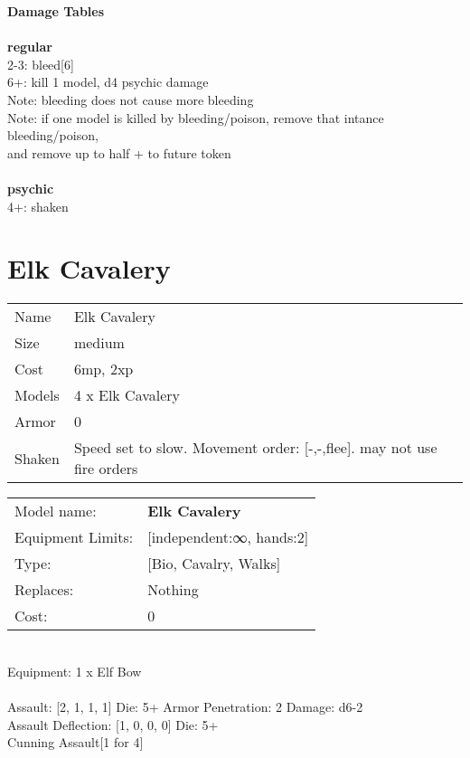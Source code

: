 {\bf Damage Tables} \\
\ \\ {\bf regular } \\
2-3: bleed[6] \\
6+: kill 1 model, d4 psychic damage \\
Note: bleeding does not cause more bleeding \\
Note: if one model is killed by bleeding/poison, remove that intance bleeding/poison, \\ and remove up to half + to future token \\
\ \\ {\bf psychic } \\
4+: shaken \\










\pagebreak\pagebreak

\section{ Elk Cavalery }

\begin{tabular}{ll}
  Name & Elk Cavalery \\
  Size & medium\\
  Cost & 6mp, 2xp\\
  Models & 4 x Elk Cavalery\\
  Armor & 0\\
  Shaken & Speed set to slow. Movement order: [-,-,flee]. may not use fire orders\\
\end{tabular}

\noindent 

\noindent
\begin{tabular}{ll}
Model name: &{\bf Elk Cavalery } \\
Equipment Limits: &[independent:∞, hands:2] \\
Type: &[Bio, Cavalry, Walks] \\
Replaces: &Nothing \\
Cost: & 0\\
\end{tabular}
\ \\
Equipment: 1 x Elf Bow \\
\ \\
Assault: [2, 1, 1, 1] Die: 5+ Armor Penetration: 2 Damage: d6-2 \\
Assault Deflection: [1, 0, 0, 0] Die: 5+\\
\indent Cunning Assault[1 for 4]\\ 
 
